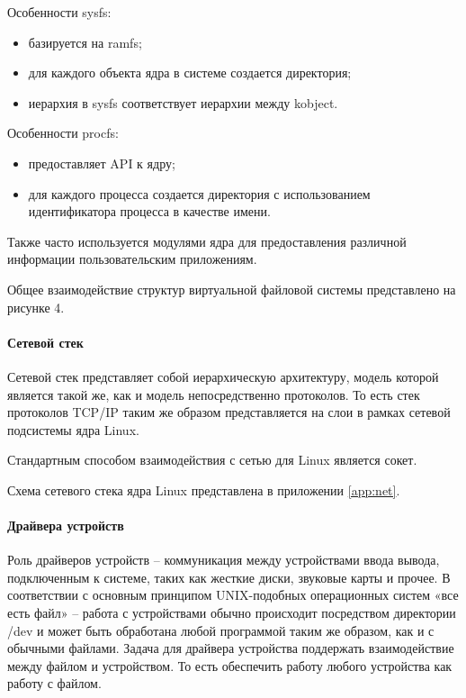 \documentclass{gost7.32-2001}
\begin{document}
Особенности sysfs:

\begin{itemize}
  \item
  базируется на ramfs;
\item
  для каждого объекта ядра в системе создается директория;
\item
  иерархия в sysfs соответствует иерархии между kobject.
\end{itemize}

Особенности procfs:

\begin{itemize}
\item
  предоставляет API к ядру;
\item
  для каждого процесса создается директория с использованием
  идентификатора процесса в качестве имени.
\end{itemize}

Также часто используется модулями ядра для предоставления различной
информации пользовательским приложениям.

Общее взаимодействие структур виртуальной файловой системы
представлено на рисунке 4.

\newpage
\paragraph{Сетевой стек}

Сетевой стек представляет собой иерархическую архитектуру, модель
которой является такой же, как и модель непосредственно протоколов. То
есть стек протоколов TCP/IP таким же образом представляется на слои в
рамках сетевой подсистемы ядра Linux.

Стандартным способом взаимодействия с сетью для Linux является сокет.

Схема сетевого стека ядра Linux представлена в приложении
\ref{app:net}.

\paragraph{Драйвера устройств}
Роль драйверов устройств – коммуникация между устройствами ввода
вывода, подключенным к системе, таких как жесткие диски, звуковые
карты и прочее. В соответствии с основным принципом UNIX-подобных
операционных систем «все есть файл» – работа с устройствами обычно
происходит посредством директории /dev и может быть обработана любой
программой таким же образом, как и с обычными файлами. Задача для
драйвера устройства поддержать взаимодействие между файлом и
устройством. То есть обеспечить работу любого устройства как работу с
файлом.
\end{document}
